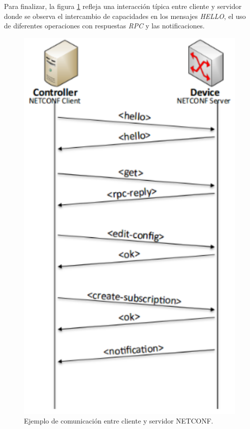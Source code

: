   Para finalizar, la figura \ref{fig:netconf_ejemplo} refleja una interacción típica entre cliente y servidor donde se observa el intercambio de capacidades en los mensajes \textit{HELLO}, el uso de diferentes operaciones con respuestas \textit{RPC} y las notificaciones.

  \begin{figure}[H]
	\centering
	\includegraphics[scale=0.75]{Figures/netconf_ejemplo.pdf}
	\caption{Ejemplo de comunicación entre cliente y servidor NETCONF.}
	\label{fig:netconf_ejemplo}
  \end{figure}

